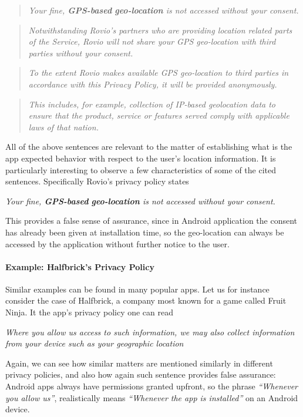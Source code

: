 \documentclass[twoside,letterpaper]{soups}
\theoremstyle{definition}
\begin{document}
\begin{quote}
\emph{Your fine, \textbf{GPS-based} \textbf{geo-location} is not accessed without your consent.}
\end{quote}

\begin{quote}
\emph{Notwithstanding Rovio's partners who are providing location related parts of the Service, Rovio will not share your GPS geo-location with third parties without your consent.}
\end{quote}

\begin{quote}
\emph{To the extent Rovio makes available GPS geo-location to third parties in accordance with this Privacy Policy, it will be provided anonymously.}
\end{quote}

\begin{quote}
\emph{This includes, for example, collection of IP-based geolocation data to ensure that the product, service or features served comply with applicable laws of that nation.}
\end{quote}

All of the above sentences are relevant to the matter of establishing what is the app expected behavior with respect to the user's location information. It is particularly interesting to observe a few characteristics of some of the cited sentences. Specifically Rovio's privacy policy states

\emph{Your fine, \textbf{GPS-based} \textbf{geo-location} is not accessed without your consent.}

This provides a false sense of assurance, since in Android application the consent has already been given at installation time, so the geo-location can always be accessed by the application without further notice to the user.

\paragraph{Example: Halfbrick's Privacy Policy}
Similar examples can be found in many popular apps. Let us for instance consider the case of Halfbrick, a company most known for a game called Fruit Ninja. It the app's privacy policy one can read

\emph{Where you allow us access to such information, we may also collect information from your device such as your geographic location}

Again, we can see how similar matters are mentioned similarly in different privacy policies, and also how again such sentence provides false assurance: Android apps always have permissions granted upfront, so the phrase \emph{``Whenever you allow us''}, realistically means \emph{``Whenever the app is installed''} on an Android device.
\end{document}
